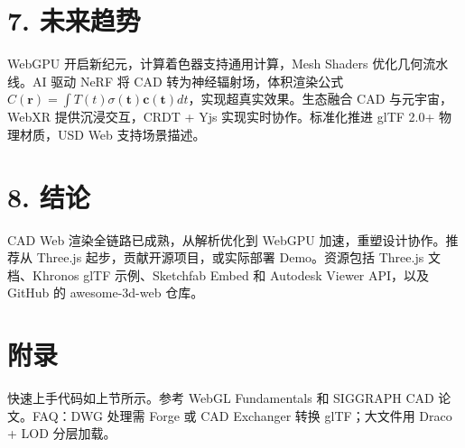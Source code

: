 \chapter{7. 未来趋势}
WebGPU 开启新纪元，计算着色器支持通用计算，Mesh Shaders 优化几何流水线。AI 驱动 NeRF 将 CAD 转为神经辐射场，体积渲染公式 $C(\mathbf{r}) = \int T(t) \sigma(\mathbf{t}) \mathbf{c}(\mathbf{t}) dt$，实现超真实效果。生态融合 CAD 与元宇宙，WebXR 提供沉浸交互，CRDT + Yjs 实现实时协作。标准化推进 glTF 2.0+ 物理材质，USD Web 支持场景描述。\par
\chapter{8. 结论}
CAD Web 渲染全链路已成熟，从解析优化到 WebGPU 加速，重塑设计协作。推荐从 Three.js 起步，贡献开源项目，或实际部署 Demo。资源包括 Three.js 文档、Khronos glTF 示例、Sketchfab Embed 和 Autodesk Viewer API，以及 GitHub 的 awesome-3d-web 仓库。\par
\chapter{附录}
快速上手代码如上节所示。参考 WebGL Fundamentals 和 SIGGRAPH CAD 论文。FAQ：DWG 处理需 Forge 或 CAD Exchanger 转换 glTF；大文件用 Draco + LOD 分层加载。\par
